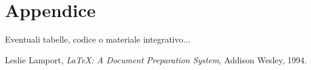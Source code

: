 \documentclass[a4paper,12pt]{report}
\begin{document}
    \appendix
    \chapter{Appendice}
    Eventuali tabelle, codice o materiale integrativo...

    \clearpage
    \begin{thebibliography}{9}

        Leslie Lamport,
        \textit{LaTeX: A Document Preparation System},
        Addison Wesley, 1994.


    \end{thebibliography}
\end{document}

